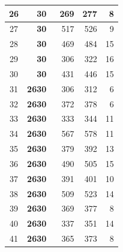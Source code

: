 \documentclass{article}
\def\THR{\bf\textcolor{B}{30}}
\def\FOR{\bf\textcolor{A}{26\text{-}30}}
\begin{document}
\begin{longtable}[c]{|c|r|r|r|r|}
    26 & \THR\ & 269 & 277 & 8\\\midrule
    27 & \THR\ & 517 & 526 & 9\\\midrule
    28 & \THR\ & 469 & 484 & 15\\\midrule
    29 & \THR\ & 306 & 322 & 16\\\midrule
    30 & \THR\ & 431 & 446 & 15\\
  \midrule%
    31 & \FOR\ & 306 & 312 & 6\\\midrule
    32 & \FOR\ & 372 & 378 & 6\\\midrule
    33 & \FOR\ & 333 & 344 & 11\\\midrule
    34 & \FOR\ & 567 & 578 & 11\\\midrule
    35 & \FOR\ & 379 & 392 & 13\\\midrule
    36 & \FOR\ & 490 & 505 & 15\\\midrule
    37 & \FOR\ & 391 & 401 & 10\\\midrule
    38 & \FOR\ & 509 & 523 & 14\\\midrule
    39 & \FOR\ & 369 & 377 & 8\\\midrule
    40 & \FOR\ & 337 & 351 & 14\\\midrule
    41 & \FOR\ & 365 & 373 & 8\\
  \bottomrule
\end{longtable}
\begin{center}
  \\
  \\
  \\
  \\
\end{center}
\end{document}
